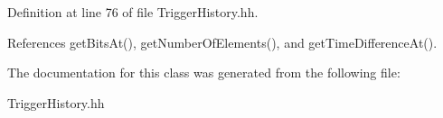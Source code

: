 Definition at line 76 of file TriggerHistory.hh.

References getBitsAt(), getNumberOfElements(), and getTimeDifferenceAt().

The documentation for this class was generated from the following file:\begin{DoxyCompactItemize}
\item 
TriggerHistory.hh\end{DoxyCompactItemize}
